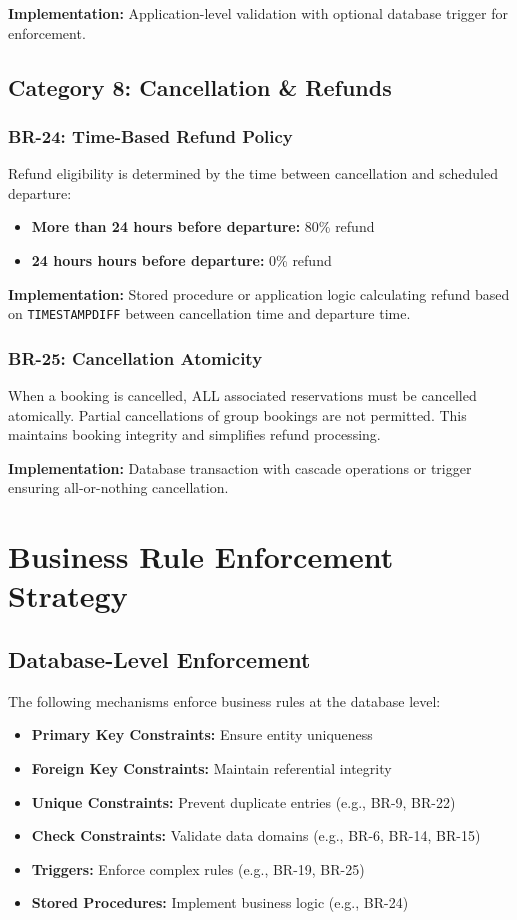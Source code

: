 \documentclass[12pt,a4paper,openany]{report}
\begin{document}
\textbf{Implementation:} Application-level validation with optional database trigger for enforcement.

\subsection{Category 8: Cancellation \& Refunds}

\subsubsection{BR-24: Time-Based Refund Policy}
Refund eligibility is determined by the time between cancellation and scheduled departure:
\begin{itemize}
    \item \textbf{More than 24 hours before departure:} 80\% refund
    \item \textbf{24 hours hours before departure:} 0\% refund
\end{itemize}

\textbf{Implementation:} Stored procedure or application logic calculating refund based on \texttt{TIMESTAMPDIFF} between cancellation time and departure time.

\subsubsection{BR-25: Cancellation Atomicity}
When a booking is cancelled, ALL associated reservations must be cancelled atomically. Partial cancellations of group bookings are not permitted. This maintains booking integrity and simplifies refund processing.

\textbf{Implementation:} Database transaction with cascade operations or trigger ensuring all-or-nothing cancellation.

\section{Business Rule Enforcement Strategy}

\subsection{Database-Level Enforcement}
The following mechanisms enforce business rules at the database level:
\begin{itemize}
    \item \textbf{Primary Key Constraints:} Ensure entity uniqueness
    \item \textbf{Foreign Key Constraints:} Maintain referential integrity
    \item \textbf{Unique Constraints:} Prevent duplicate entries (e.g., BR-9, BR-22)
    \item \textbf{Check Constraints:} Validate data domains (e.g., BR-6, BR-14, BR-15)
    \item \textbf{Triggers:} Enforce complex rules (e.g., BR-19, BR-25)
    \item \textbf{Stored Procedures:} Implement business logic (e.g., BR-24)
\end{itemize}
\end{document}
